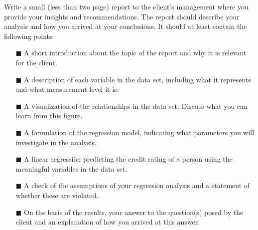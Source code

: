 Write a small (less than two page) report to the client's management where you provide your insights and recommendations. The report should describe your analysis and how you arrived at your conclusions. It should at least contain the following points: \\

\begin{itemize}
    \item[$\blacksquare$] A short introduction about the topic of the report and why it is relevant for the client.
    \item[$\blacksquare$] A description of each variable in the data set, including what it represents and what measurement level it is. 
    \item[$\blacksquare$] A visualization of the relationships in the data set. Discuss what you can learn from this figure.
    \item[$\blacksquare$] A formulation of the regression model, indicating what parameters you will investigate in the analysis.
    \item[$\blacksquare$] A linear regression predicting the credit rating of a person using the meaningful variables in the data set.
    \item[$\blacksquare$] A check of the assumptions of your regression analysis and a statement of whether these are violated.
    \item[$\blacksquare$] On the basis of the results, your answer to the question(s) posed by the client and an explanation of how you arrived at this answer.
\end{itemize}

\clearpage %